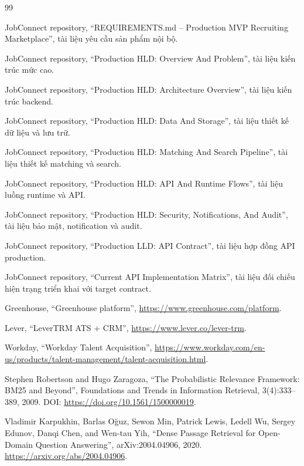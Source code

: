 \begin{thebibliography}{99}

JobConnect repository, ``REQUIREMENTS.md -- Production MVP Recruiting Marketplace'', tài liệu yêu cầu sản phẩm nội bộ.

JobConnect repository, ``Production HLD: Overview And Problem'', tài liệu kiến trúc mức cao.

JobConnect repository, ``Production HLD: Architecture Overview'', tài liệu kiến trúc backend.

JobConnect repository, ``Production HLD: Data And Storage'', tài liệu thiết kế dữ liệu và lưu trữ.

JobConnect repository, ``Production HLD: Matching And Search Pipeline'', tài liệu thiết kế matching và search.

JobConnect repository, ``Production HLD: API And Runtime Flows'', tài liệu luồng runtime và API.

JobConnect repository, ``Production HLD: Security, Notifications, And Audit'', tài liệu bảo mật, notification và audit.

JobConnect repository, ``Production LLD: API Contract'', tài liệu hợp đồng API production.

JobConnect repository, ``Current API Implementation Matrix'', tài liệu đối chiếu hiện trạng triển khai với target contract.

Greenhouse, ``Greenhouse platform'', \url{https://www.greenhouse.com/platform}.

Lever, ``LeverTRM ATS + CRM'', \url{https://www.lever.co/lever-trm}.

Workday, ``Workday Talent Acquisition'', \url{https://www.workday.com/en-us/products/talent-management/talent-acquisition.html}.

Stephen Robertson and Hugo Zaragoza, ``The Probabilistic Relevance Framework: BM25 and Beyond'', Foundations and Trends in Information Retrieval, 3(4):333--389, 2009. DOI: \url{https://doi.org/10.1561/1500000019}.

Vladimir Karpukhin, Barlas Oğuz, Sewon Min, Patrick Lewis, Ledell Wu, Sergey Edunov, Danqi Chen, and Wen-tau Yih, ``Dense Passage Retrieval for Open-Domain Question Answering'', arXiv:2004.04906, 2020. \url{https://arxiv.org/abs/2004.04906}.


\end{thebibliography}
